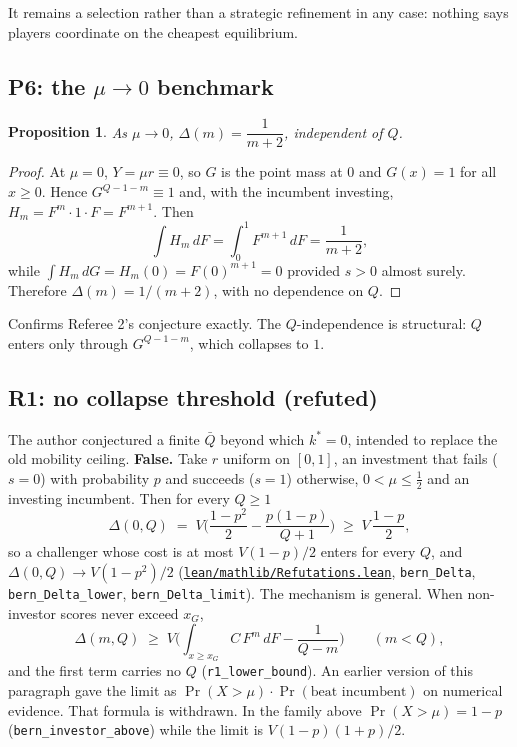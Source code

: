 \documentclass[11pt]{article}
\newtheorem{proposition}{Proposition}
\newcommand{\file}[1]{\href{run:#1}{\texttt{#1}}}
\begin{document}
It remains a selection rather than a strategic refinement in any case:
nothing says players coordinate on the cheapest equilibrium.

\subsection{P6: the \texorpdfstring{$\mu\to0$}{mu to 0} benchmark}
\label{prop:P6}
\begin{proposition}
As $\mu\to0$, $\Delta(m)=\dfrac{1}{m+2}$, independent of $Q$.
\end{proposition}
\begin{proof}
At $\mu=0$, $Y=\mu r\equiv0$, so $G$ is the point mass at $0$ and
$G(x)=1$ for all $x\ge0$. Hence $G^{Q-1-m}\equiv1$ and, with the
incumbent investing, $H_m=F^m\cdot1\cdot F=F^{m+1}$. Then
\[
  \int H_m\,dF = \int_0^1 F^{m+1}\,dF = \frac{1}{m+2},
\]
while $\int H_m\,dG = H_m(0) = F(0)^{m+1}=0$ provided $s>0$ almost
surely. Therefore $\Delta(m)=1/(m+2)$, with no dependence on $Q$.
\end{proof}
Confirms Referee 2's conjecture exactly. The $Q$-independence is
structural: $Q$ enters only through $G^{Q-1-m}$, which collapses to
$1$.

\subsection{R1: no collapse threshold (refuted)}
\label{sec:R1}
The author conjectured a finite $\bar Q$ beyond which $k^*=0$, intended
to replace the old mobility ceiling. \textbf{False.} Take $r$ uniform on
$[0,1]$, an investment that fails ($s=0$) with probability $p$ and succeeds
($s=1$) otherwise, $0<\mu\le\tfrac12$ and an investing incumbent. Then for
every $Q\ge1$
\[
  \Delta(0,Q) \;=\; V\Big(\frac{1-p^2}{2}-\frac{p(1-p)}{Q+1}\Big)
  \;\ge\; V\,\frac{1-p}{2},
\]
so a challenger whose cost is at most $V(1-p)/2$ enters for every $Q$, and
$\Delta(0,Q)\to V(1-p^2)/2$ (\file{lean/mathlib/Refutations.lean},
\texttt{bern\_Delta}, \texttt{bern\_Delta\_lower}, \texttt{bern\_Delta\_limit}).
The mechanism is general. When non-investor scores never exceed $x_G$,
\[
  \Delta(m,Q) \;\ge\; V\Big(\int_{x\ge x_G} C\,F^m\,dF-\frac{1}{Q-m}\Big)
  \qquad (m<Q),
\]
and the first term carries no $Q$ (\texttt{r1\_lower\_bound}). An earlier
version of this paragraph gave the limit as
$\Pr(X>\mu)\cdot\Pr(\text{beat incumbent})$ on numerical evidence. That formula
is withdrawn. In the family above $\Pr(X>\mu)=1-p$
(\texttt{bern\_investor\_above}) while the limit is $V(1-p)(1+p)/2$.
\end{document}
